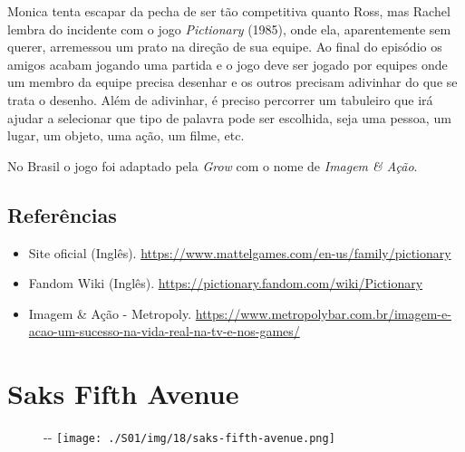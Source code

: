 Monica tenta escapar da pecha de ser tão competitiva quanto Ross, mas
Rachel lembra do incidente com o jogo \emph{Pictionary} (1985), onde
ela, aparentemente sem querer, arremessou um prato na direção de sua
equipe. Ao final do episódio os amigos acabam jogando uma partida e o
jogo deve ser jogado por equipes onde um membro da equipe precisa
desenhar e os outros precisam adivinhar do que se trata o desenho. Além
de adivinhar, é preciso percorrer um tabuleiro que irá ajudar a
selecionar que tipo de palavra pode ser escolhida, seja uma pessoa, um
lugar, um objeto, uma ação, um filme, etc.

No Brasil o jogo foi adaptado pela \emph{Grow} com o nome de
\emph{Imagem \& Ação}.

\hypertarget{referuxeancias-9}{%
\subsection{Referências}\label{referuxeancias-9}}

\begin{itemize}
\tightlist
\item
  \sloppy Site oficial (Inglês). \url{https://www.mattelgames.com/en-us/family/pictionary}
\item
  \sloppy Fandom Wiki (Inglês). \url{https://pictionary.fandom.com/wiki/Pictionary}
\item
  \sloppy Imagem & Ação - Metropoly. \url{https://www.metropolybar.com.br/imagem-e-acao-um-sucesso-na-vida-real-na-tv-e-nos-games/}
\end{itemize}

\hypertarget{saks-fifth-avenue}{%
\section{Saks Fifth Avenue}\label{saks-fifth-avenue}}

\begin{figure}[!ht]
  \begin{adjustwidth}{-\oddsidemargin-1in}{-\rightmargin}
    \centering
    \texttt{[image: ./S01/img/18/saks-fifth-avenue.png]}
  \end{adjustwidth}
\end{figure}

